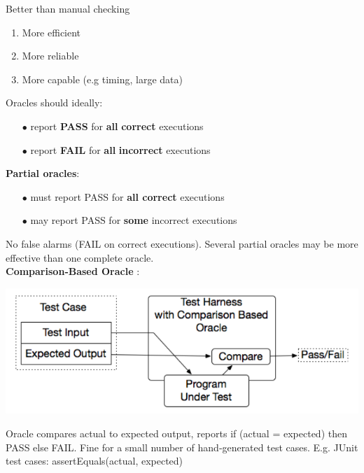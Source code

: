\documentclass{article}
\begin{document}
\begin{multicols}{2}
\noindent Better
than
manual
checking
\begin{enumerate}
    \item More efficient
    \item More reliable
    \item More capable (e.g timing, large data)\\
\end{enumerate}

\noindent Oracles
should ideally:
\begin{itemize}
    \item [$\bullet$]report
\textbf{PASS} for
\textbf{all} \textbf{correct} executions
    \item [$\bullet$]report
\textbf{FAIL} for
\textbf{all} \textbf{incorrect} executions\\
\end{itemize}

\noindent \textbf{Partial
oracles}:
\begin{itemize}
    \item [$\bullet$]must report PASS for \textbf{all correct} executions
    \item [$\bullet$]may report PASS for \textbf{some} incorrect executions
\end{itemize}
No
false
alarms (FAIL
on
correct
executions). Several partial
oracles
may be more
effective
than one
complete oracle.\\

\noindent \textbf{Comparison‐Based
Oracle} :\\

\begin{center}
    \includegraphics[scale=0.4]{image/50.PNG}
\end{center}

\noindent Oracle
compares
actual
to
expected
output,
reports
if
(actual
=
expected)
then
PASS
else
FAIL.
Fine
for
a
small
number
of
hand‐generated
test
cases. E.g.
JUnit
test
cases:
assertEquals(actual,
expected)\\


\end{multicols}
\end{document}
